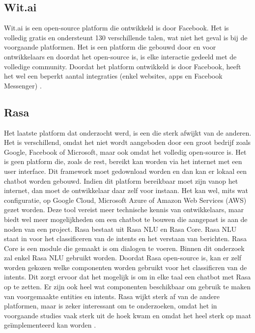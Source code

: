 \subsection{Wit.ai}
\label{subsec:nlp-platformen-wit.ai}

Wit.ai is een open-source platform die ontwikkeld is door Facebook. Het is volledig gratis en ondersteunt 130 verschillende talen, wat niet het geval is bij de voorgaande platformen. Het is een platform die gebouwd door en voor ontwikkelaars en doordat het open-source is, is elke interactie gedeeld met de volledige community. Doordat het platform ontwikkeld is door Facebook, heeft het wel een beperkt aantal integraties (enkel websites, apps en Facebook Messenger) \autocite{Wit2020}.

\subsection{Rasa}
\label{subsec:nlp-platformen-rasa}

Het laatste platform dat onderzocht werd, is een die sterk afwijkt van de anderen. Het is verschillend, omdat het niet wordt aangeboden door een groot bedrijf zoals Google, Facebook of Microsoft, maar ook omdat het volledig open-source is. Het is geen platform die, zoals de rest, bereikt kan worden via het internet met een user interface. Dit framework moet gedownload worden en dan kan er lokaal een chatbot worden gebouwd. Indien dit platform bereikbaar moet zijn vanop het internet, dan moet de ontwikkelaar daar zelf voor instaan. Het kan wel, mits wat configuratie, op Google Cloud, Microsoft Azure of Amazon Web Services (AWS) gezet worden. Deze tool vereist meer technische kennis van ontwikkelaars, maar biedt wel meer mogelijkheden om een chatbot te bouwen die aangepast is aan de noden van een project. Rasa bestaat uit Rasa NLU en Rasa Core.  Rasa NLU staat in voor het classificeren van de intents en het verstaan van berichten. Rasa Core is een module die gemaakt is om dialogen te voeren. Binnen dit onderzoek zal enkel Rasa NLU gebruikt worden. Doordat Rasa open-source is, kan er zelf worden gekozen welke componenten worden gebruikt voor het classificren van de intents. Dit zorgt ervoor dat het mogelijk is om in elke taal een chatbot met Rasa op te zetten. Er zijn ook heel wat componenten beschikbaar om gebruik te maken van voorgemaakte entities en intents. Rasa wijkt sterk af van de andere platformen, maar is zeker interessant om te onderzoeken, omdat het in voorgaande studies vaak sterk uit de hoek kwam en omdat het heel sterk op maat geïmplementeerd kan worden \autocite{RASA2020}.

